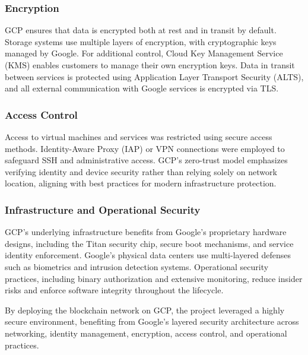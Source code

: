 \subsubsection{Encryption}
GCP ensures that data is encrypted both at rest and in transit by default. Storage systems use multiple layers of encryption, with cryptographic keys managed by Google. For additional control, Cloud Key Management Service (KMS) enables customers to manage their own encryption keys. Data in transit between services is protected using Application Layer Transport Security (ALTS), and all external communication with Google services is encrypted via TLS.

\subsubsection{Access Control}
Access to virtual machines and services was restricted using secure access methods. Identity-Aware Proxy (IAP) or VPN connections were employed to safeguard SSH and administrative access. GCP’s zero-trust model emphasizes verifying identity and device security rather than relying solely on network location, aligning with best practices for modern infrastructure protection.

\subsubsection{Infrastructure and Operational Security}
GCP's underlying infrastructure benefits from Google's proprietary hardware designs, including the Titan security chip, secure boot mechanisms, and service identity enforcement. Google's physical data centers use multi-layered defenses such as biometrics and intrusion detection systems. Operational security practices, including binary authorization and extensive monitoring, reduce insider risks and enforce software integrity throughout the lifecycle.

\noindent By deploying the blockchain network on GCP, the project leveraged a highly secure environment, benefiting from Google’s layered security architecture across networking, identity management, encryption, access control, and operational practices.

